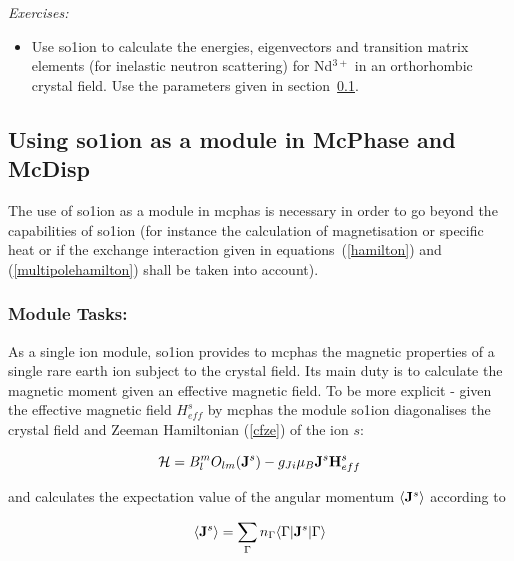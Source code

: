 \vspace{1cm}
{\em Exercises:}
\begin{itemize}
\item Use {\prg so1ion} to calculate the energies, eigenvectors and
transition matrix elements (for inelastic
neutron scattering) for Nd$^{3+}$ in an orthorhombic crystal field.
Use the parameters given in section~\ref{cf1ion}.
\end{itemize}



\subsection{Using {\prg so1ion} as a module in {\prg McPhase} and {\prg McDisp}}
\label{cf1ion}


The use 
 of {\prg so1ion} as a module in {\prg mcphas} is necessary in order to 
 go beyond the capabilities of {\prg so1ion} (for instance the calculation
 of magnetisation or specific heat or if the exchange interaction
 given in equations~(\ref{hamilton}) and (\ref{multipolehamilton})
  shall be taken into account).  

\subsubsection{Module Tasks:}


As a single ion module, {\prg so1ion} provides to {\prg mcphas} the magnetic properties
of a single rare earth ion subject to the crystal field. Its main duty is
to calculate the magnetic moment given an effective magnetic field. 
To be more explicit - given the effective magnetic field $H^s_{eff}$ by {\prg mcphas}
 the module {\prg so1ion}
 diagonalises the crystal field and Zeeman Hamiltonian (\ref{cfze}) of the
 ion $s$:

\begin{equation}\label{cfze}
 {\mathcal H}=  B_l^m O_{lm}({\mathbf J}^s) 
	     -  g_{Ji} \mu_B {\mathbf J}^s {\mathbf H^s_{eff}} 
\end{equation}

and calculates the expectation value of the angular momentum $\langle \mathbf J^s \rangle$
according to

\begin{equation}
\langle \mathbf J^s \rangle =
\sum_{\Gamma} n_{\Gamma} \langle \Gamma | \mathbf J^s | \Gamma \rangle
\end{equation}

